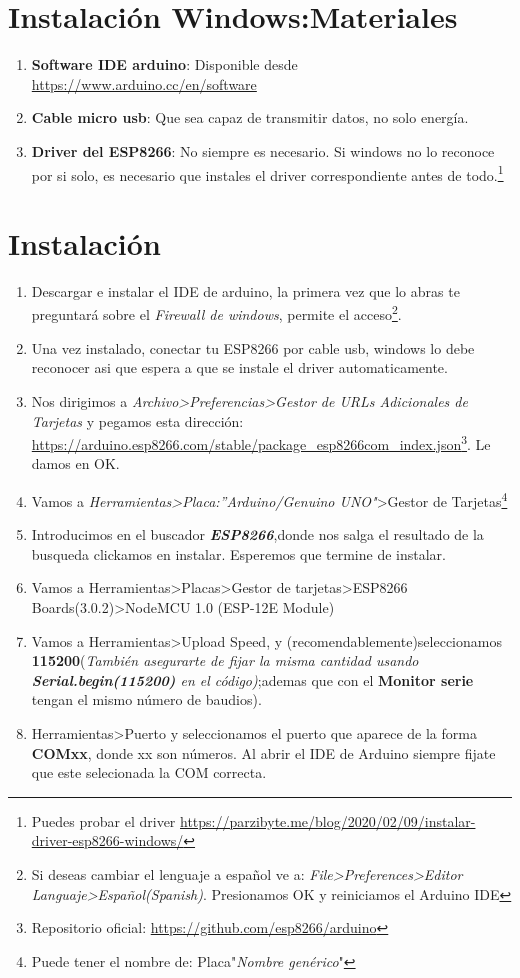 \documentclass[
	11pt, %
	fleqn, %
	a4paper, %
]{LegrandOrangeBook}
\begin{document}
\section{Instalación Windows:Materiales}
\begin{enumerate}
\item \textbf{Software IDE arduino}: Disponible desde \url{https://www.arduino.cc/en/software}
\item \textbf{Cable micro usb}: Que sea capaz de transmitir datos, no solo energía.
\item \textbf{Driver del ESP8266}: No siempre es necesario. Si windows no lo reconoce por si solo, es necesario que instales el driver correspondiente antes de todo.\footnote{Puedes probar el driver \url{https://parzibyte.me/blog/2020/02/09/instalar-driver-esp8266-windows/} }
\end{enumerate}
\section{Instalación}
\begin{enumerate}
\item Descargar e instalar el IDE de arduino, la primera vez que lo abras te preguntará sobre el \textit{Firewall de windows}, permite el acceso\footnote{Si deseas cambiar el lenguaje a español ve a: \textit{File>Preferences>Editor Languaje>Español(Spanish)}. Presionamos OK y reiniciamos el Arduino IDE}.
\item Una vez instalado, conectar tu ESP8266 por cable usb, windows lo debe reconocer asi que espera a que se instale el driver automaticamente.
\item Nos dirigimos a \textit{Archivo>Preferencias>Gestor de URLs Adicionales de Tarjetas} y pegamos esta dirección: \url{https://arduino.esp8266.com/stable/package_esp8266com_index.json}\footnote{Repositorio oficial: \url{https://github.com/esp8266/arduino}}. Le damos en OK.
\item Vamos a \textit{Herramientas>Placa:''Arduino/Genuino UNO"}>Gestor de Tarjetas\footnote{Puede tener el nombre de: Placa"\textit{Nombre genérico}"}
\item Introducimos en el buscador \textbf{\textit{ESP8266}},donde nos salga el resultado de la busqueda clickamos en instalar. Esperemos que termine de instalar.
\item Vamos a Herramientas>Placas>Gestor de tarjetas>ESP8266 Boards(3.0.2)>NodeMCU 1.0 (ESP-12E Module)
\item Vamos a Herramientas>Upload Speed, y (recomendablemente)seleccionamos \textbf{115200}(\textit{También asegurarte de fijar la misma cantidad usando \textbf{Serial.begin(115200)}  en el código)};ademas que con el \textbf{Monitor serie} tengan el mismo número de baudios).
\item Herramientas>Puerto y seleccionamos el puerto que aparece de la forma \textbf{COMxx}, donde xx son números. Al abrir el IDE de Arduino siempre fijate que este selecionada la COM correcta.
\end{enumerate}
\end{document}
